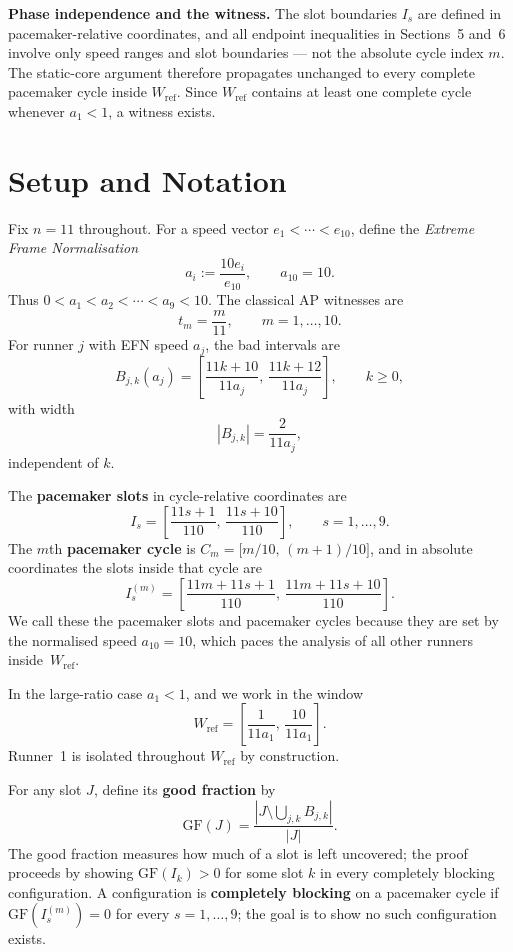 \documentclass[12pt,a4paper]{amsart}
\theoremstyle{definition}
\theoremstyle{remark}
\newcommand{\GF}{\mathrm{GF}}
\newcommand{\Wref}{W_{\mathrm{ref}}}
\begin{document}
\medskip\noindent\textbf{Phase independence and the witness.}
The slot boundaries $I_s$ are defined in pacemaker-relative coordinates, and all
endpoint inequalities in Sections~5 and~6 involve only speed ranges and slot boundaries
--- not the absolute cycle index $m$. The static-core argument therefore propagates
unchanged to every complete pacemaker cycle inside $\Wref$. Since $\Wref$ contains at
least one complete cycle whenever $a_1<1$, a witness exists.

\section{Setup and Notation}

Fix $n=11$ throughout. For a speed vector $e_1<\cdots<e_{10}$, define the
\emph{Extreme Frame Normalisation}
\[
  a_i := \frac{10e_i}{e_{10}},\qquad a_{10}=10.
\]
Thus $0<a_1<a_2<\cdots<a_9<10$. The classical AP witnesses are
\[
  t_m = \frac{m}{11},\qquad m=1,\ldots,10.
\]
For runner $j$ with EFN speed $a_j$, the bad intervals are
\[
  B_{j,k}(a_j) = \left[\frac{11k+10}{11a_j},\,\frac{11k+12}{11a_j}\right],\qquad k\ge 0,
\]
with width
\[
  |B_{j,k}| = \frac{2}{11a_j},
\]
independent of $k$.

The \textbf{pacemaker slots} in cycle-relative coordinates are
\[
  I_s = \left[\frac{11s+1}{110},\,\frac{11s+10}{110}\right],\qquad s=1,\ldots,9.
\]
The $m$th \textbf{pacemaker cycle} is $C_m=\bigl[m/10,\,(m+1)/10\bigr]$, and in absolute
coordinates the slots inside that cycle are
\[
  I_s^{(m)} = \left[\frac{11m+11s+1}{110},\,\frac{11m+11s+10}{110}\right].
\]
We call these the pacemaker slots and pacemaker cycles because they are set by the
normalised speed $a_{10}=10$, which paces the analysis of all other runners inside~$\Wref$.

In the large-ratio case $a_1<1$, and we work in the window
\[
  \Wref = \left[\frac{1}{11a_1},\,\frac{10}{11a_1}\right].
\]
Runner~1 is isolated throughout $\Wref$ by construction.

For any slot $J$, define its \textbf{good fraction} by
\[
  \GF(J) = \frac{|J\setminus\bigcup_{j,k}B_{j,k}|}{|J|}.
\]
The good fraction measures how much of a slot is left uncovered; the proof proceeds by
showing $\GF(I_k)>0$ for some slot $k$ in every completely blocking configuration.
A configuration is \textbf{completely blocking} on a pacemaker cycle if $\GF(I_s^{(m)})=0$
for every $s=1,\ldots,9$; the goal is to show no such configuration exists.
\end{document}
